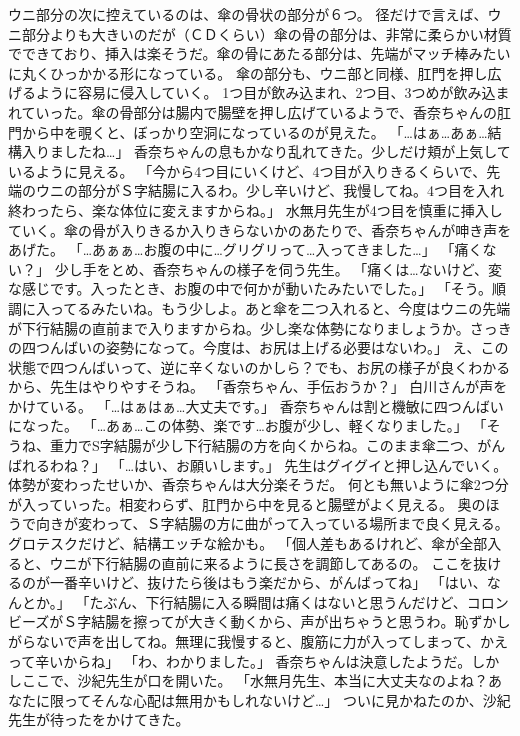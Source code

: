 ウニ部分の次に控えているのは、傘の骨状の部分が６つ。
径だけで言えば、ウニ部分よりも大きいのだが（ＣＤくらい）傘の骨の部分は、非常に柔らかい材質でできており、挿入は楽そうだ。傘の骨にあたる部分は、先端がマッチ棒みたいに丸くひっかかる形になっている。
傘の部分も、ウニ部と同様、肛門を押し広げるように容易に侵入していく。
1つ目が飲み込まれ、2つ目、3つめが飲み込まれていった。傘の骨部分は腸内で腸壁を押し広げているようで、香奈ちゃんの肛門から中を覗くと、ぼっかり空洞になっているのが見えた。
「…はぁ…あぁ…結構入りましたね…」
香奈ちゃんの息もかなり乱れてきた。少しだけ頬が上気しているように見える。
「今から4つ目にいくけど、4つ目が入りきるくらいで、先端のウニの部分がＳ字結腸に入るわ。少し辛いけど、我慢してね。4つ目を入れ終わったら、楽な体位に変えますからね。」
水無月先生が4つ目を慎重に挿入していく。傘の骨が入りきるか入りきらないかのあたりで、香奈ちゃんが呻き声をあげた。
「…あぁぁ…お腹の中に…グリグリって…入ってきました…」
「痛くない？」
少し手をとめ、香奈ちゃんの様子を伺う先生。
「痛くは…ないけど、変な感じです。入ったとき、お腹の中で何かが動いたみたいでした。」
「そう。順調に入ってるみたいね。もう少しよ。あと傘を二つ入れると、今度はウニの先端が下行結腸の直前まで入りますからね。少し楽な体勢になりましょうか。さっきの四つんばいの姿勢になって。今度は、お尻は上げる必要はないわ。」
え、この状態で四つんばいって、逆に辛くないのかしら？でも、お尻の様子が良くわかるから、先生はやりやすそうね。
「香奈ちゃん、手伝おうか？」
白川さんが声をかけている。
「…はぁはぁ…大丈夫です。」
香奈ちゃんは割と機敏に四つんばいになった。
「…あぁ…この体勢、楽です…お腹が少し、軽くなりました。」
「そうね、重力でS字結腸が少し下行結腸の方を向くからね。このまま傘二つ、がんばれるわね？」
「…はい、お願いします。」
先生はグイグイと押し込んでいく。体勢が変わったせいか、香奈ちゃんは大分楽そうだ。
何とも無いように傘2つ分が入っていった。相変わらず、肛門から中を見ると腸壁がよく見える。
奥のほうで向きが変わって、Ｓ字結腸の方に曲がって入っている場所まで良く見える。グロテスクだけど、結構エッチな絵かも。
「個人差もあるけれど、傘が全部入ると、ウニが下行結腸の直前に来るように長さを調節してあるの。
ここを抜けるのが一番辛いけど、抜けたら後はもう楽だから、がんばってね」
「はい、なんとか。」
「たぶん、下行結腸に入る瞬間は痛くはないと思うんだけど、コロンビーズがＳ字結腸を擦ってが大きく動くから、声が出ちゃうと思うわ。恥ずかしがらないで声を出してね。無理に我慢すると、腹筋に力が入ってしまって、かえって辛いからね」
「わ、わかりました。」
香奈ちゃんは決意したようだ。しかしここで、沙紀先生が口を開いた。
「水無月先生、本当に大丈夫なのよね？あなたに限ってそんな心配は無用かもしれないけど…」
ついに見かねたのか、沙紀先生が待ったをかけてきた。
